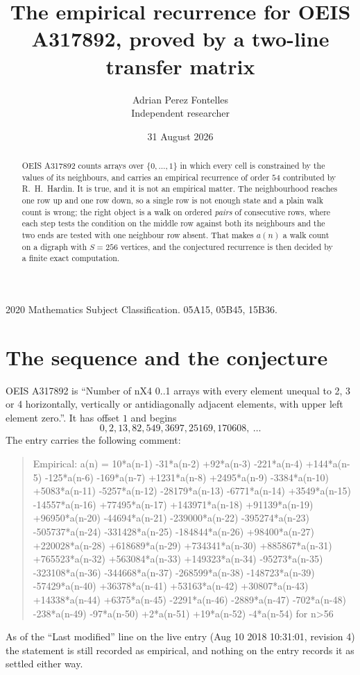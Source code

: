 \documentclass[11pt,a4paper]{article}
\title{The empirical recurrence for OEIS A317892, proved by a two-line transfer matrix}
\author{Adrian Perez Fontelles\\ \small Independent researcher}
\date{31 August 2026}
\theoremstyle{plain}
\theoremstyle{definition}
\begin{document}
\maketitle

\begin{abstract}
OEIS A317892 counts arrays over $\{0,\dots,1\}$ in which every cell is constrained by the
values of its neighbours, and carries an empirical recurrence of order $54$ contributed
by R.~H.~Hardin. It is true, and it is not an empirical matter. The neighbourhood reaches one
row up and one row down, so a single row is not enough state and a plain walk count
is wrong; the right object is a walk on ordered \emph{pairs} of consecutive rows, where
each step tests the condition on the middle row against both its neighbours and the two
ends are tested with one neighbour row absent. That makes $a(n)$ a walk count on a digraph
with $S=256$ vertices, and the conjectured recurrence is then decided by a finite exact
computation.
\end{abstract}

\noindent\small 2020 Mathematics Subject Classification. 05A15, 05B45, 15B36.\normalsize

\section{The sequence and the conjecture}

OEIS A317892 is ``Number of nX4 0..1 arrays with every element unequal to 2, 3 or 4 horizontally, vertically or antidiagonally adjacent elements, with upper left element zero.''. It has offset $1$ and begins
\[
0, 2, 13, 82, 549, 3697, 25169, 170608,\ \dots
\]
The entry carries the following comment:
\begin{quote}\small
Empirical: a(n) = 10*a(n-1) -31*a(n-2) +92*a(n-3) -221*a(n-4) +144*a(n-5) -125*a(n-6) -169*a(n-7) +1231*a(n-8) +2495*a(n-9) -3384*a(n-10) +5083*a(n-11) -5257*a(n-12) -28179*a(n-13) -6771*a(n-14) +3549*a(n-15) -14557*a(n-16) +77495*a(n-17) +143971*a(n-18) +91139*a(n-19) +96950*a(n-20) -44694*a(n-21) -239000*a(n-22) -395274*a(n-23) -505737*a(n-24) -331428*a(n-25) -184844*a(n-26) +98400*a(n-27) +220028*a(n-28) +618689*a(n-29) +734341*a(n-30) +885867*a(n-31) +765523*a(n-32) +563084*a(n-33) +149323*a(n-34) -95273*a(n-35) -323108*a(n-36) -344668*a(n-37) -268599*a(n-38) -148723*a(n-39) -57429*a(n-40) +36378*a(n-41) +53163*a(n-42) +30807*a(n-43) +14338*a(n-44) +6375*a(n-45) -2291*a(n-46) -2889*a(n-47) -702*a(n-48) -238*a(n-49) -97*a(n-50) +2*a(n-51) +19*a(n-52) -4*a(n-54) for n>56
\end{quote}
As of the ``Last modified'' line on the live entry (Aug 10 2018 10:31:01, revision 4) the statement is
still recorded as empirical, and nothing on the entry records it as settled either way.
\end{document}

